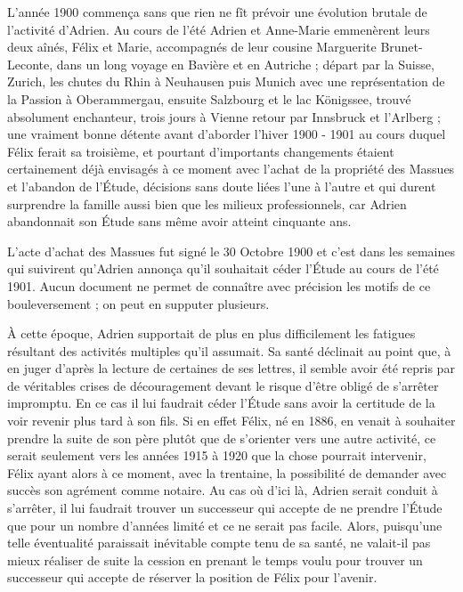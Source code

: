 \documentclass[11pt,a4paper]{report}
\begin{document}
L'année 1900 commença sans que rien ne fît prévoir une évolution brutale de l'activité d'Adrien. Au cours de l'été Adrien et Anne-Marie emmenèrent leurs deux aînés, Félix et Marie, accompagnés de leur cousine Marguerite Brunet-Leconte, dans un long voyage en Bavière et en Autriche ; départ par la Suisse, Zurich, les chutes du Rhin à Neuhausen puis Munich avec une représentation de la Passion à Oberammergau, ensuite Salzbourg et le lac Königssee, trouvé absolument enchanteur, trois jours à Vienne retour par Innsbruck et l'Arlberg ; une vraiment bonne détente avant d'aborder l'hiver 1900 - 1901 au cours duquel Félix ferait sa troisième, et pourtant d'importants changements étaient certainement déjà envisagés à ce moment avec l'achat de la propriété des Massues et l'abandon de l'Étude, décisions sans doute liées l'une à l'autre et qui durent surprendre la famille aussi bien que les milieux professionnels, car Adrien abandonnait son Étude sans même avoir atteint cinquante ans.

L'acte d'achat des Massues fut signé le 30 Octobre 1900 et c'est dans les semaines qui suivirent qu'Adrien annonça qu'il souhaitait céder l'Étude au cours de l'été 1901. Aucun document ne permet de connaître avec précision les motifs de ce bouleversement ; on peut en supputer plusieurs.

À cette époque, Adrien supportait de plus en plus difficilement les fatigues résultant des activités multiples qu'il assumait. Sa santé déclinait au point que, à en juger d'après la lecture de certaines de ses lettres, il semble avoir été repris par de véritables crises de découragement devant le risque d'être obligé de s'arrêter impromptu. En ce cas il lui faudrait céder l'Étude sans avoir la certitude de la voir revenir plus tard à son fils. Si en effet Félix, né en 1886, en venait à souhaiter prendre la suite de son père plutôt que de s'orienter vers une autre activité, ce serait seulement vers les années 1915 à 1920 que la chose pourrait intervenir, Félix ayant alors à ce moment, avec la trentaine, la possibilité de demander avec succès son agrément comme notaire. Au cas où d'ici là, Adrien serait conduit à s'arrêter, il lui faudrait trouver un successeur qui accepte de ne prendre l'Étude que pour un nombre d'années limité et ce ne serait pas facile. Alors, puisqu'une telle éventualité paraissait inévitable compte tenu de sa santé, ne valait-il pas mieux réaliser de suite la cession en prenant le temps voulu pour trouver un successeur qui accepte de réserver la position de Félix pour l'avenir.
\end{document}
